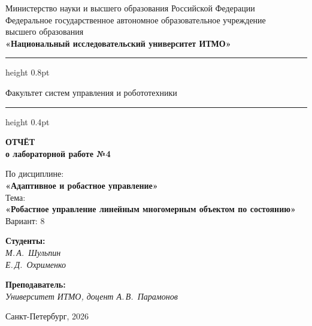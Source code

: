 \documentclass[a4paper,12pt]{article}
\begin{document}
	
	\begin{titlepage}
		\centering
		
		\vspace*{0.5cm}
		{\small
			Министерство науки и высшего образования Российской Федерации\\[2pt]
			Федеральное государственное автономное образовательное учреждение\\
			высшего образования\\[2pt]
			\textbf{«Национальный исследовательский университет ИТМО»}\\
		}
		
		\vspace{0.8cm}
		\hrule height 0.8pt
		\vspace{0.3cm}
		
		{\large Факультет систем управления и робототехники}
		
		\vspace{0.3cm}
		\hrule height 0.4pt
		\vspace{2.5cm}
		
		{\Huge\bfseries ОТЧЁТ}\\[0.4cm]
		{\LARGE\bfseries о лабораторной работе №4}\\[0.8cm]
		
		\begin{tcolorbox}[
			colback=gray!4,
			colframe=gray!10,
			boxrule=0.8pt,
			arc=4pt,
			left=12pt, right=12pt, top=8pt, bottom=8pt
			]
			\centering
			{\large По дисциплине:\\[4pt]}
			{\large\bfseries «Адаптивное и робастное управление»}\\[10pt]
			{\large Тема:\\[4pt]}
			{\large\bfseries «Робастное управление линейным многомерным объектом по состоянию»} \\[10pt]
			{\large Вариант: 8}
		\end{tcolorbox}
		\vspace{3cm}
		
		
		\begin{minipage}{0.45\textwidth}
			\raggedright
			{\large\bfseries Студенты:}\\[4pt]
			\textit{М.\,А.~Шульпин}\\
			\textit{Е.\,Д.~Охрименко}
		\end{minipage}%
		\hfill
		\begin{minipage}{0.45\textwidth}
			\raggedleft
			{\large\bfseries Преподаватель:}\\[4pt]
			\textit{Университет ИТМО, доцент \hfill А.\,В.~Парамонов}
		\end{minipage}
		
		\vfill
		\vspace{0.4cm}
		{\large Санкт-Петербург, 2026}
	\end{titlepage}
	
\end{document}
